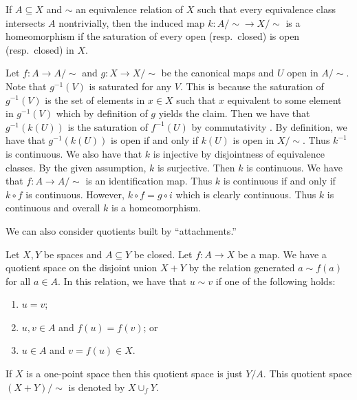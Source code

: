 \documentclass[letterpaper, 11pt, oneside]{book}
\begin{document}
\begin{prop}
  If $A \subseteq X$ and $\sim$ an equivalence relation of $X$ such that every equivalence class intersects $A$ nontrivially, then the induced map $k\colon A / \sim \to X / \sim$ is a homeomorphism if the saturation of every open (resp.\ closed) is open (resp.\ closed) in $X$.
\end{prop}
\begin{pf}
  Let $f\colon A \to A / \sim$ and $g\colon X \to X / \sim$ be the canonical maps and $U$ open in $A / \sim$.
  Note that $g^{-1}(V)$ is saturated for any $V$.
  This is because the saturation of $g^{-1}(V)$ is the set of elements in $x \in X$ such that $x$ equivalent to some element in $g^{-1}(V)$ which by definition of $g$ yields the claim.
  Then we have that $g^{-1}(k(U))$ is the saturation of $f^{-1}(U)$ by commutativity .
  By definition, we have that $g^{-1}(k(U))$ is open if and only if $k(U)$ is open in $X / \sim$.
  Thus $k^{-1}$ is continuous.
  We also have that $k$ is injective by disjointness of equivalence classes.
  By the given assumption, $k$ is surjective.
  Then $k$ is continuous.
  We have that $f\colon A \to A / \sim$ is an identification map.
  Thus $k$ is continuous if and only if $k \circ f$ is continuous.
  However, $k \circ f = g \circ i$ which is clearly continuous.
  Thus $k$ is continuous and overall $k$ is a homeomorphism.
\end{pf}

\clearpage

We can also consider quotients built by ``attachments.''

\begin{defn}[$X \cup_{f} Y$]
  Let $X, Y$ be spaces and $A \subseteq Y$ be closed.
  Let $f\colon A \to X$ be a map.
  We have a quotient space on the disjoint union $X + Y$ by the relation generated $a \sim f(a)$ for all $a \in A$.
  In this relation, we have that $u \sim v$ if one of the following holds:
  \begin{enumerate}
  \item $u = v$;
  \item $u, v \in A$ and $f(u) = f(v)$; or
  \item $u \in A$ and $v = f(u) \in X$.
  \end{enumerate}
  If $X$ is a one-point space then this quotient space is just $Y / A$.
  This quotient space $(X + Y) / \sim$ is denoted by $X \cup_{f} Y$.
\end{defn}
\end{document}
